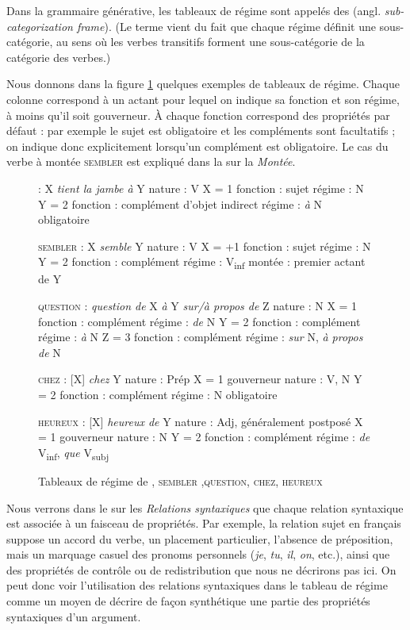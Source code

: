Dans la grammaire générative, les tableaux de régime sont appelés des  (angl. \textit{sub-categorization frame}). (Le terme vient du fait que chaque régime définit une sous-catégorie, au sens où les verbes transitifs forment une sous-catégorie de la catégorie des verbes.)

Nous donnons dans la figure \ref{fig:13-regime} quelques exemples de tableaux de régime. Chaque colonne correspond à un actant pour lequel on indique sa fonction et son régime, à moins qu'il soit gouverneur. À chaque fonction correspond des propriétés par défaut : par exemple le sujet est obligatoire et les compléments sont facultatifs ; on indique donc explicitement lorsqu'un complément est obligatoire. Le cas du verbe à montée \textsc{sembler} est expliqué dans la  sur la \textit{Montée}.


\begin{figure}

 : X \textit{tient la jambe à} Y
nature : V
X = 1
fonction : sujet 
régime : N
Y = 2
fonction : complément d’objet indirect 
régime : \textit{à }N 
obligatoire

\textsc{sembler} : X \textit{semble} Y
nature : V
X = +1
fonction : sujet 
régime : N
Y = 2
fonction : complément 
régime : V\textsubscript{inf}
montée : premier actant de Y

\textsc{question} : \textit{question de} X \textit{à }Y \textit{sur/à propos de} Z
nature : N
X = 1
fonction : complément 
régime : \textit{de} N
Y = 2
fonction : complément 
régime : \textit{à} N
Z = 3
fonction : complément 
régime : \textit{sur} N, \textit{à propos de} N

\textsc{chez} : [X] \textit{chez} Y
nature : Prép
X = 1
gouverneur
nature : V, N
Y = 2
fonction : complément
régime : N
obligatoire

\textsc{heureux} : [X] \textit{heureux de} Y
nature : Adj, généralement postposé
X = 1
gouverneur
nature : N
Y = 2
fonction : complément
régime : \textit{de} V\textsubscript{inf}, \textit{que} V\textsubscript{subj}

\caption{Tableaux de régime de , \textsc{sembler} ,\textsc{question}, \textsc{chez}, \textsc{heureux}\label{fig:13-regime}}
\end{figure}

Nous verrons dans le  sur les \textit{Relations syntaxiques} que chaque relation syntaxique est associée à un faisceau de propriétés. Par exemple, la relation sujet en français suppose un accord du verbe, un placement particulier, l’absence de préposition, mais un marquage casuel des pronoms personnels (\textit{je}, \textit{tu}, \textit{il}, \textit{on}, etc.), ainsi que des propriétés de contrôle ou de redistribution que nous ne décrirons pas ici. On peut donc voir l’utilisation des relations syntaxiques dans le tableau de régime comme un moyen de décrire de façon synthétique une partie des propriétés syntaxiques d’un argument.

